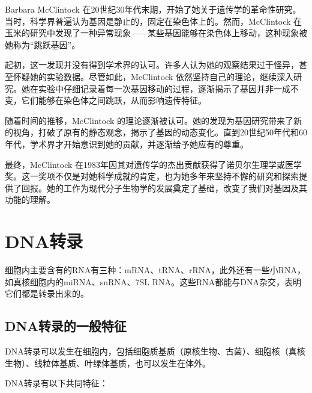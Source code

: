\begin{gs}
	\hspace{2em}Barbara McClintock 在20世纪30年代末期，开始了她关于遗传学的革命性研究。当时，科学界普遍认为基因是静止的，固定在染色体上的。然而，McClintock 在玉米的研究中发现了一种异常现象——某些基因能够在染色体上移动，这种现象被她称为“跳跃基因”。

	\hspace{2em}起初，这一发现并没有得到学术界的认可。许多人认为她的观察结果过于怪异，甚至怀疑她的实验数据。尽管如此，McClintock 依然坚持自己的理论，继续深入研究。她在实验中仔细记录着每一次基因移动的过程，逐渐揭示了基因并非一成不变，它们能够在染色体之间跳跃，从而影响遗传特征。

	\hspace{2em}随着时间的推移，McClintock 的理论逐渐被认可。她的发现为基因研究带来了新的视角，打破了原有的静态观念，揭示了基因的动态变化。直到20世纪50年代和60年代，学术界才开始意识到她的贡献，并逐渐给予她应有的尊重。

	\hspace{2em}最终，McClintock 在1983年因其对遗传学的杰出贡献获得了诺贝尔生理学或医学奖。这一奖项不仅是对她科学成就的肯定，也为她多年来坚持不懈的研究和探索提供了回报。她的工作为现代分子生物学的发展奠定了基础，改变了我们对基因及其功能的理解。
\end{gs}

\section{DNA转录}

细胞内主要含有的RNA有三种：mRNA、tRNA、rRNA，此外还有一些小RNA，如真核细胞内的miRNA、snRNA、7SL RNA。这些RNA都能与DNA杂交，表明它们都是转录出来的。

\subsection{DNA转录的一般特征}

DNA转录可以发生在细胞内，包括细胞质基质（原核生物、古菌）、细胞核（真核生物）、线粒体基质、叶绿体基质，也可以发生在体外。

DNA转录有以下共同特征：


